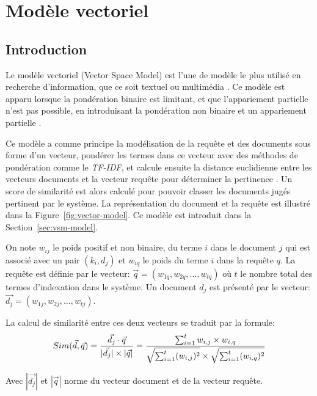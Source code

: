 \chapter{Modèle vectoriel}
\section{Introduction}
Le modèle vectoriel (Vector Space Model) est l'une de modèle le plus utilisé en recherche d'information, que ce soit textuel  ou multimédia \citep{vsm-images}. Ce modèle est apparu lorsque la pondération binaire est limitant, et que l'appariement partielle n'est pas possible, en introduisant la pondération non binaire et un appariement partielle \citep{modern-ir}.

Ce modèle a comme principe la modélisation de la requête et des documents sous forme d'un vecteur, pondérer les termes dans ce vecteur avec des méthodes de pondération comme le \emph{TF-IDF}, et calcule ensuite la distance euclidienne entre les vecteurs documents et la vecteur requête pour déterminer la pertinence \citep{ir-on-web}. Un score de similarité est alors calculé pour pouvoir classer les documents jugés pertinent par le système. La représentation du document et la requête est illustré dans la Figure~\ref{fig:vector-model}. Ce modèle est introduit dans la Section~\ref{sec:vsm-model}.

\begin{definition}
    On note $w_{ij}$ le poids positif et non binaire, du terme $i$ dans le document $j$ qui est associé avec un pair $(k_{i}, d_{j})$ et $w_{iq}$ le poids du terme $i$ dans la requête $q$. La requête est définie par le vecteur: $ \vec{q} = (w_{1q}, w_{2q}, \dots, w_{tq}) $ où $t$ le nombre total des termes d'indexation dans le système. Un document $d_{j}$ est présenté par le vecteur: $ \vec{d_{j}} = (w_{1j}, w_{2j}, \dots, w_{tj}) $.

    La calcul de similarité entre ces deux vecteurs se traduit par la formule:
    \[
        Sim(\vec{d}, \vec{q}) = \frac{\vec{d_{j}} \cdot \vec{q}}{ |\vec{d_{j}}| \times |\vec{q}| } \\
        = \frac{\sum_{i=1}^{t} w_{i,j} \times w_{i,q}}{\sqrt{\sum_{i=1}^{t} (w_{i,j})^2} \times \sqrt{\sum_{i=1}^{t} (w_{i,q})^2}}
    \]

    Avec $ |\vec{d_{j}}| $ et $ |\vec{q}| $ norme du vecteur document et de la vecteur requête.
\end{definition}

